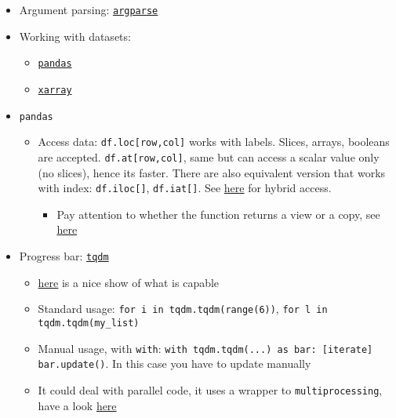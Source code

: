 \documentclass[a4paper,12pt,%
              final%
              ]{article}
\begin{document}
\begin{itemize}
\begin{itemize}
    \end{itemize}
  \item Argument parsing: \href{https://docs.python.org/3/library/argparse.html#module-argparse}{\texttt{argparse}}
  \item Working with datasets:
    \begin{itemize}
      \item \href{https://pandas.pydata.org/docs/user_guide/10min.html}{\texttt{pandas}}
      \item \href{http://xarray.pydata.org/en/stable/user-guide/index.html}{\texttt{xarray}}
    \end{itemize}
  \item \texttt{pandas}
    \begin{itemize}
      \item Access data: \verb|df.loc[row,col]| works with labels. Slices, arrays, booleans are accepted. \verb|df.at[row,col]|, same but can access a scalar value only (no slices), hence its faster. There are also equivalent version that works with index: \verb|df.iloc[]|, \verb|df.iat[]|. See \href{https://stackoverflow.com/questions/28754603/indexing-pandas-data-frames-integer-rows-named-columns}{here} for hybrid access.
        \begin{itemize}
          \item Pay attention to whether the function returns a view or a copy, see \href{https://pandas.pydata.org/pandas-docs/stable/user_guide/indexing.html#indexing-view-versus-copy}{here}
        \end{itemize}
    \end{itemize}
  \item Progress bar: \href{https://github.com/tqdm/tqdm#manual}{\texttt{tqdm}}
    \begin{itemize}
      \item \href{https://www.analyticsvidhya.com/blog/2021/05/how-to-use-progress-bars-in-python/}{here} is a nice show of what is capable
      \item Standard usage: \verb|for i in tqdm.tqdm(range(6))|, \verb|for l in tqdm.tqdm(my_list)|
      \item Manual usage, with \texttt{with}: \verb|with tqdm.tqdm(...) as bar: [iterate] bar.update()|. In this case you have to update manually
      \item It could deal with parallel code, it uses a wrapper to \texttt{multiprocessing}, have a look \href{https://tqdm.github.io/docs/contrib.concurrent/}{here}
    \end{itemize}

\end{itemize}
\end{document}
